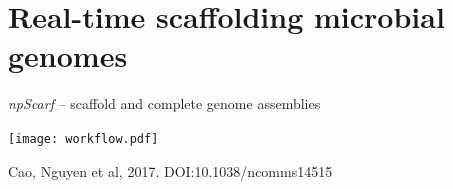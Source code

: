 \documentclass{beamer}
\begin{document}
\section{Real-time scaffolding microbial genomes}
\begin{frame}{\emph{npScarf} -- scaffold and complete genome assemblies}
 \begin{center}
 \vspace*{-0.6cm}
 \texttt{[image: workflow.pdf]}  
 
 \vspace*{-0.3cm}
Cao, Nguyen et al, 2017.  DOI:10.1038/ncomms14515
\end{center}
\end{frame}
\end{document}
